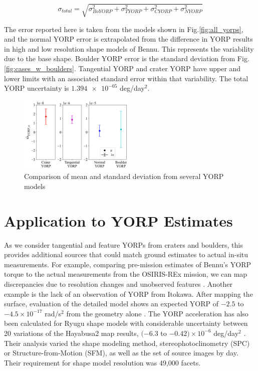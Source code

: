 \begin{equation}
    \sigma_{total} = \sqrt{\sigma_{BoYORP}^2 + \sigma_{TYORP}^2 + \sigma_{CYORP}^2 + \sigma_{NYORP}^2}
\end{equation}

The error reported here is taken from the models shown in Fig.\ref{fig:all_yorps}, and the normal YORP error is extrapolated from the difference in YORP results in high and low resolution shape models of Bennu. This represents the variability due to the base shape. Boulder YORP error is the standard deviation from Fig.\ref{fig:cases_w_boulders}. Tangential YORP and crater YORP have upper and lower limits with an associated standard error within that variability. The total YORP uncertainty is $\num{1.394e-05}$ deg/day$^2$.

\begin{figure}[H]
    \centering
    \includegraphics[width=0.49\textwidth]{fig/error_compare.png}
    \caption{Comparison of mean and standard deviation from several YORP models}
    \label{fig:err_comp}
\end{figure}
\section{Application to YORP Estimates}\label{implications}

As we consider tangential and feature YORPs from craters and boulders, this provides additional sources that could match ground estimates to actual in-situ measurements. For example, comparing pre-mission estimates of Bennu's YORP torque to the actual measurements from the OSIRIS-REx mission, we can map discrepancies due to resolution changes and unobserved features \citep{Nolan2019}. Another example is the lack of an observation of YORP from Itokawa. After mapping the surface, evaluation of the detailed model shows an expected YORP of $-2.5$ to $-4.5 \times 10^{-17}$ rad/s$^2$ from the geometry alone \citep{Scheeres2007a}. The YORP acceleration has also been calculated for Ryugu shape models with considerable uncertainty between 20 variations of the Hayabusa2 map results, $(-6.3$ to $-0.42) \times 10^{-6}$ deg/day$^2$ \citep{Kanamaru2021}. Their analysis varied the shape modeling method, stereophotoclinometry (SPC) or Structure-from-Motion (SFM), as well as the set of source images by day. Their requirement for shape model resolution was 49,000 facets. 

